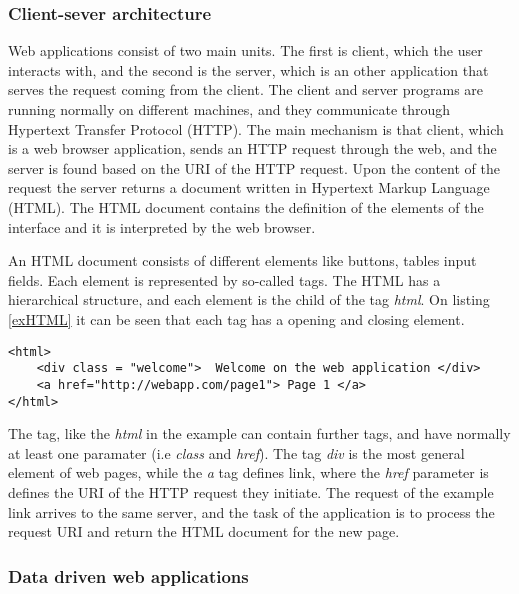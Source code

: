 \subsubsection{Client-sever architecture} \label{clientServer}

Web applications consist of two main units. The first is client, which the user interacts with, and the second is the server, which is an other application that serves the request coming from the client. The client and server programs are running normally on different machines, and they communicate through Hypertext Transfer Protocol (HTTP). The main mechanism is that client, which is a web browser application, sends an HTTP request through the web, and the server is found based on the URI of the HTTP request. Upon the content of the request the server returns a document written in Hypertext Markup Language (HTML). The HTML document contains the definition of the elements of the interface and it is interpreted by the web browser.


An HTML document consists of different elements like buttons, tables input fields. Each element is represented by so-called tags. The HTML has a hierarchical structure, and each element is the child of the tag \textit{html}. On listing \ref{exHTML} it can be seen that each tag has a opening and closing element.

\begin{lstlisting}[captionpos=b, caption=Example HTML document, label=exHTML, belowskip=1em, aboveskip=2em,
basicstyle=\footnotesize,frame=single]
<html>
	<div class = "welcome">  Welcome on the web application </div>
	<a href="http://webapp.com/page1"> Page 1 </a>
</html>
\end{lstlisting}

The tag, like the \textit{html} in the example can contain further tags, and have normally at least one paramater (i.e \textit{class} and \textit{href}). The tag \textit{div} is the most general element of web pages, while the \textit{a} tag defines link, where the \textit{href} parameter is defines the URI of the HTTP request they initiate. The request of the example link arrives to the same server, and the task of the application is to process the request URI and return the HTML document for the new page. 


\subsubsection{Data driven web applications} \label{dataDriven}

